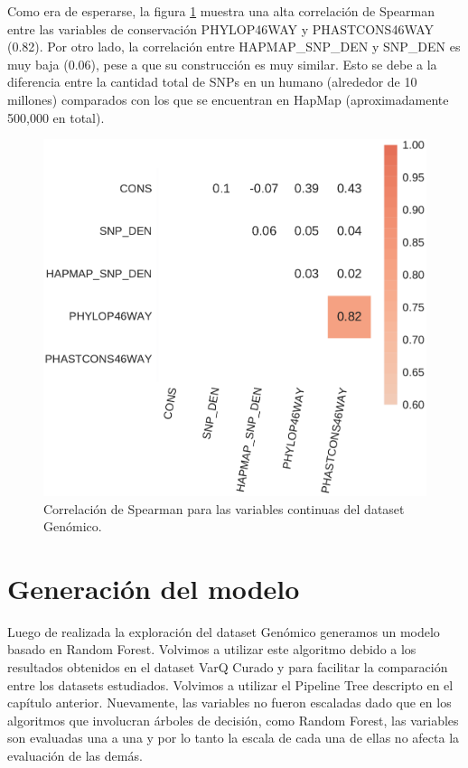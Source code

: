 Como era de esperarse, la figura \ref{fig:corrplot_genomic} muestra una alta correlación de Spearman entre las variables de conservación PHYLOP46WAY y PHASTCONS46WAY (0.82). Por otro lado, la correlación entre HAPMAP\_SNP\_DEN y SNP\_DEN es muy baja (0.06), pese a que su construcción es muy similar. Esto se debe a la diferencia entre la cantidad total de SNPs en un humano (alrededor de 10 millones) comparados con los que se encuentran en HapMap (aproximadamente 500,000 en total).

\begin{figure}[H]
    \centering
    \includegraphics[scale=0.45]{documents/latex/figures/3/genomic/genomic_corr.pdf}
    \caption{Correlación de Spearman para las variables continuas del dataset Genómico.}
    \label{fig:corrplot_genomic}
\end{figure}


\section{Generación del modelo}

Luego de realizada la exploración del dataset Genómico generamos un modelo basado en Random Forest. Volvimos a utilizar este algoritmo debido a los resultados obtenidos en el dataset VarQ Curado y para facilitar la comparación entre los datasets estudiados. Volvimos a utilizar el Pipeline Tree descripto en el capítulo anterior. Nuevamente, las variables no fueron escaladas dado que en los algoritmos que involucran árboles de decisión, como Random Forest, las variables son evaluadas una a una y por lo tanto la escala de cada una de ellas no afecta la evaluación de las demás.

